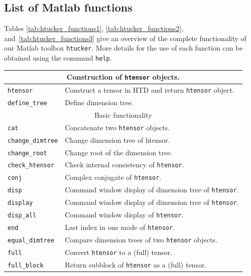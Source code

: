 \documentclass[11pt, a4paper]{article}
\newcommand{\htucker}{{\tt htucker}}
\begin{document}
\begin{preprint}
\appendix

\newpage
\section{List of {\sc Matlab} functions} \label{sec:functionality}

Tables \ref{tab:htucker_functions1}, \ref{tab:htucker_functions2}, and~\ref{tab:htucker_functions3}
give an overview of the complete functionality of our {\sc Matlab} toolbox \htucker. More details
for the use of each function can be obtained using the command {\tt help}.

\begin{table}[h] \small
  \begin{tabular}{|p{3.2cm}|p{11cm}|}
\hline 
\multicolumn{2}{|c|}{Construction of \texttt{htensor} objects.} \\
\hline 
\texttt{htensor}            & Construct a tensor in HTD and return {\tt htensor} object.\\
\texttt{define\_tree}       & Define dimension tree.\\
\hline \hline
\multicolumn{2}{|c|}{Basic functionality} \\
\hline
\texttt{cat}                & Concatenate two {\tt htensor} objects.\\
\texttt{change\_dimtree}    & Change dimension tree of htensor.\\
\texttt{change\_root}       & Change root of the dimension tree.\\
\texttt{check\_htensor}     & Check internal consistency of {\tt htensor}.\\
\texttt{conj}               & Complex conjugate of {\tt htensor}.\\
\texttt{disp}               & Command window display of dimension tree of {\tt htensor}.\\
\texttt{display}            & Command window display of dimension tree of {\tt htensor}.\\
\texttt{disp\_all}          & Command window display of {\tt htensor}.\\
\texttt{end}                & Last index in one mode of {\tt htensor}.\\
\texttt{equal\_dimtree}     & Compare dimension trees of two {\tt htensor} objects.\\
\texttt{full}               & Convert {\tt htensor} to a (full) tensor.\\
\texttt{full\_block}        & Return subblock of {\tt htensor} as a (full) tensor.\\

\end{tabular}
\end{table}
\end{preprint}
\end{document}
